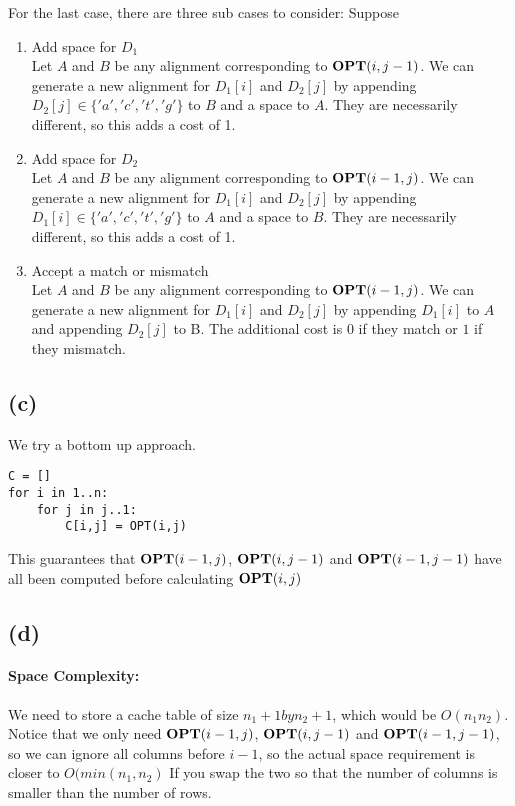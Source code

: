 For the last case, there are three sub cases to consider:
Suppose 
\begin{enumerate}
    \item Add space for $D_1$\\
    Let $A$ and $B$ be any alignment corresponding to $\textbf{OPT}(i,j-1)$. We can generate a new alignment for $D_1[i]$ and $D_2[j]$ by appending $D_2[j] \in \{'a', 'c', 't', 'g'\}$ to $B$ and a space to $A$. They are necessarily different, so this adds a cost of 1.
    \item Add space for $D_2$\\
    Let $A$ and $B$ be any alignment corresponding to $\textbf{OPT}(i-1,j)$. We can generate a new alignment for $D_1[i]$ and $D_2[j]$ by appending $D_1[i] \in \{'a', 'c', 't', 'g'\}$ to $A$ and a space to $B$. They are necessarily different, so this adds a cost of 1.
    \item Accept a match or mismatch\\
    Let $A$ and $B$ be any alignment corresponding to $\textbf{OPT}(i-1,j)$. We can generate a new alignment for $D_1[i]$ and $D_2[j]$ by appending $D_1[i]$ to $A$ and appending $D_2[j]$ to B. The additional cost is $0$ if they match or $1$ if they mismatch.
\end{enumerate}

\subsection*{(c)}
We try a bottom up approach.

\begin{verbatim}
C = []
for i in 1..n:
    for j in j..1:
        C[i,j] = OPT(i,j)
\end{verbatim}

This guarantees that $\textbf{OPT}(i-1,j)$, $\textbf{OPT}(i,j-1)$ and $\textbf{OPT}(i-1,j-1)$ have all been computed before calculating $\textbf{OPT}(i,j)$

\subsection*{(d)}
\paragraph{Space Complexity:}
We need to store a cache table of size $n_1+1 by n_2+1$, which would be $O(n_1n_2)$. Notice that we only need $\textbf{OPT}(i-1,j)$, $\textbf{OPT}(i,j-1)$ and $\textbf{OPT}(i-1,j-1)$, so we can ignore all columns before $i-1$, so the actual space requirement is closer to $O(min(n_1,n_2)$ If you swap the two so that the number of columns is smaller than the number of rows.

